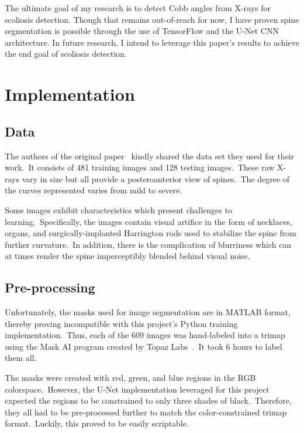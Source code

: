 \documentclass[conference]{IEEEtran}
\begin{document}
    The ultimate goal of my research is to detect Cobb angles from X-rays for scoliosis detection.
    Though that remains out-of-reach for now, I have proven spine segmentation is possible through the use of TensorFlow and the U-Net CNN architecture.
    In future research, I intend to leverage this paper's results to achieve the end goal of scoliosis detection.

    \section{Implementation}\label{sec:implementation}

    \subsection{Data}\label{subsec:data}

    The authors of the original paper~\cite{cobb-angle-measurement-of-spine-from-x-ray-images-using-convolutional-neural-network} kindly shared the data set they used for their work.\ It consists of 481 training images and 128 testing images.\ These raw X-rays vary in size but all provide a posteroanterior view of spines.\ The degree of the curves represented varies from mild to severe.

    Some images exhibit characteristics which present challenges to learning.\ Specifically, the images contain visual artifice in the form of necklaces, organs, and surgically-implanted Harrington rods used to stabilize the spine from further curvature.\ In addition, there is the complication of blurriness which can at times render the spine imperceptibly blended behind visual noise.

    \subsection{Pre-processing}\label{subsec:pre-processing}

    Unfortunately, the masks used for image segmentation are in MATLAB format, thereby proving incompatible with this project's Python training implementation.\ Thus, each of the 609 images was hand-labeled into a trimap~\cite{create-trimaps-with-topaz-mask-ai} using the Mask AI program created by Topaz Labs~\cite{topaz-mask-ai}.\ It took 6 hours to label them all.

    The masks were created with red, green, and blue regions in the RGB colorspace.\ However, the U-Net implementation leveraged for this project expected the regions to be constrained to only three shades of black.\ Therefore, they all had to be pre-processed further to match the color-constrained trimap format.\ Luckily, this proved to be easily scriptable.
\end{document}
